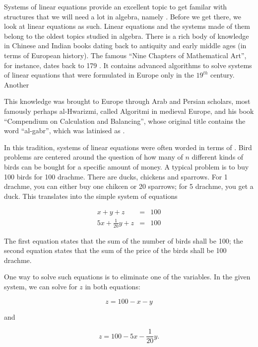 \documentclass[tikz]{scrreprt}
\begin{document}
Systems of linear equations provide an excellent topic
to get familar with structures that we will need a lot
in algebra, namely . Before we get there,
we look at linear equations as such. Linear equations
and the systems made of them belong to the oldest topics
studied in algebra. There is a rich body of knowledge in
Chinese and Indian books dating back to antiquity and
early middle ages (in terms of European history). The
famous ``Nine Chapters of Mathematical Art'', for instance,
dates back to 179 . It contains advanced
algorithms to solve systems of linear equations that were
formulated in Europe only in the $19^{th}$ century.
Another

This knowledge was brought to Europe through Arab and
Persian scholars, most famously perhaps al-Hwarizmi,
called Algoritmi in medieval Europe, 
and his book ``Compendium on Calculation and Balancing'',
whose original title contains the word ``al-gabr'',
which was latinised as .

In this tradition, systems of linear equations were
often worded in terms of .
Bird problems are centered around the question of
how many of $n$ different kinds of birds can be
bought for a specific amount of money. A typical
problem is to buy 100 birds for 100 drachme.
There are ducks, chickens and sparrows. 
For 1 drachme, you can either buy one chikcen
or 20 sparrows; for 5 drachme, you get a duck.
This translates into the simple
system of equations

\begin{equation}
\begin{array}{lcl}
x + y + z & = & 100\\
5x + \frac{1}{20}y + z & = & 100
\end{array}
\end{equation}

The first equation states that the sum of the number of birds
shall be 100; the second equation states that the sum of the
price of the birds shall be 100 drachme.

One way to solve such equations is 
to eliminate one of the variables.
In the given system, we can solve for $z$
in both equations:

\begin{equation}
z = 100 - x - y
\end{equation}

and

\begin{equation}
z = 100 - 5x - \frac{1}{20}y.
\end{equation}
\end{document}
